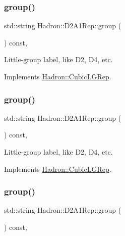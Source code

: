 \subsubsection{\texorpdfstring{group()}{group()}\hspace{0.1cm}{\footnotesize\ttfamily [3/5]}}
{\footnotesize\ttfamily std\+::string Hadron\+::\+D2\+A1\+Rep\+::group (\begin{DoxyParamCaption}{ }\end{DoxyParamCaption}) const\hspace{0.3cm}{\ttfamily [inline]}, {\ttfamily [virtual]}}

Little-\/group label, like D2, D4, etc. 

Implements \mbox{\hyperlink{structHadron_1_1CubicLGRep_a9bdb14b519a611d21379ed96a3a9eb41}{Hadron\+::\+Cubic\+L\+G\+Rep}}.

\mbox{\label{structHadron_1_1D2A1Rep_a6762c80fbf9ea0761e63a9ad4711ed39}} 
\subsubsection{\texorpdfstring{group()}{group()}\hspace{0.1cm}{\footnotesize\ttfamily [4/5]}}
{\footnotesize\ttfamily std\+::string Hadron\+::\+D2\+A1\+Rep\+::group (\begin{DoxyParamCaption}{ }\end{DoxyParamCaption}) const\hspace{0.3cm}{\ttfamily [inline]}, {\ttfamily [virtual]}}

Little-\/group label, like D2, D4, etc. 

Implements \mbox{\hyperlink{structHadron_1_1CubicLGRep_a9bdb14b519a611d21379ed96a3a9eb41}{Hadron\+::\+Cubic\+L\+G\+Rep}}.

\mbox{\label{structHadron_1_1D2A1Rep_a6762c80fbf9ea0761e63a9ad4711ed39}} 
\subsubsection{\texorpdfstring{group()}{group()}\hspace{0.1cm}{\footnotesize\ttfamily [5/5]}}
{\footnotesize\ttfamily std\+::string Hadron\+::\+D2\+A1\+Rep\+::group (\begin{DoxyParamCaption}{ }\end{DoxyParamCaption}) const\hspace{0.3cm}{\ttfamily [inline]}, {\ttfamily [virtual]}}

